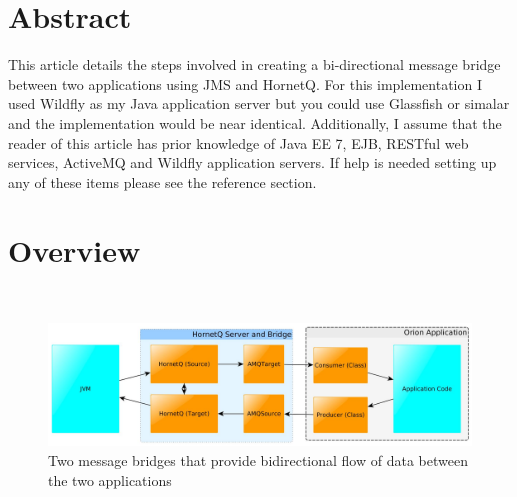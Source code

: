\documentclass[
10pt, %
letterpaper, %
oneside, %
headinclude,footinclude, %
BCOR5mm, %
]{scrartcl}
\title{\normalfont\spacedallcaps{Bi-Directional JMS Bridge}} %
\author{\spacedlowsmallcaps{Michael Meding* , mikeymeding@gmail.com}} %
\date{} %
\begin{document}
\maketitle %

\setcounter{tocdepth}{2} %

\tableofcontents %

\thispagestyle{empty} %

 
\section*{Abstract}
This article details the steps involved in creating a bi-directional message bridge between two applications using JMS and HornetQ. For this implementation I used Wildfly as my Java application server but you could use Glassfish or simalar and the implementation would be near identical. Additionally, I assume that the reader of this article has prior knowledge of Java EE 7, EJB, RESTful web services, ActiveMQ and Wildfly application servers. If help is needed setting up any of these items please see the reference section.



\section{Overview}



~\newline

\begin{figure}[h]
\centering
\includegraphics[width=15.5cm]{FlowchartPic} %
\caption{Two message bridges that provide bidirectional flow of data between the two applications }
\label{fig:servers}
\end{figure}
\end{document}
